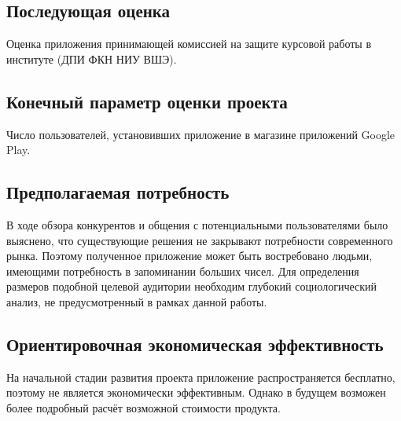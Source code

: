 \documentclass[draft]{article}
\begin{document}
\subsection{Последующая оценка}
Оценка приложения принимающей комиссией на защите курсовой работы в институте (ДПИ ФКН НИУ ВШЭ).
\subsection{Конечный параметр оценки проекта}
Число пользователей, установивших приложение в магазине приложений Google Play.\\
\subsection{Предполагаемая потребность}
В ходе обзора конкурентов и общения с потенциальными пользователями было выяснено, что существующие решения не закрывают потребности современного рынка. Поэтому полученное приложение может быть востребовано людьми, имеющими потребность в запоминании больших чисел. Для определения размеров подобной целевой аудитории необходим глубокий социологический анализ, не предусмотренный в рамках данной работы.
\subsection{Ориентировочная экономическая эффективность}
На начальной стадии развития проекта приложение распространяется бесплатно, поэтому не является экономически эффективным. Однако в будущем возможен более подробный расчёт возможной стоимости продукта.
\end{document}
